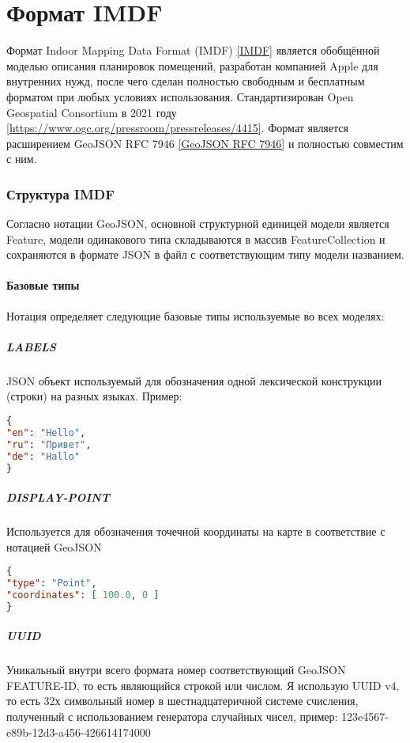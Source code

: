   \section{Формат IMDF}
    Формат Indoor Mapping Data Format (IMDF) \ref{IMDF} является обобщённой моделью описания планировок помещений, разработан компанией Apple для внутренних нужд, после чего сделан полностью свободным и бесплатным форматом при любых условиях использования. Стандартизирован Open Geospatial Consortium в 2021 году \ref{https://www.ogc.org/pressroom/pressreleases/4415}. Формат является расширением GeoJSON RFC 7946 \ref{GeoJSON RFC 7946} и полностью совместим с ним.

    \subsubsection{Структура IMDF}
      Согласно нотации GeoJSON, основной структурной единицей модели является Feature, модели одинакового типа складываются в массив FeatureCollection и сохраняются в формате JSON в файл с соответствующим типу модели названием.

      \paragraph{Базовые типы}
        Нотация определяет следующие базовые типы используемые во всех моделях:
        \subparagraph{LABELS}
          JSON объект используемый для обозначения одной лексической конструкции (строки) на разных языках. Пример:
          \begin{lstlisting}[language=json,caption={Пример модели LABELS}]
{
"en": "Hello",
"ru": "Привет",
"de": "Hallo"
}
          \end{lstlisting}

        \subparagraph{DISPLAY-POINT}
          Используется для обозначения точечной координаты на карте в соответствие с нотацией GeoJSON
          \begin{lstlisting}[language=json,caption={Пример модели DISPLAY-POINT}]
{
"type": "Point",
"coordinates": [ 100.0, 0 ]
}
          \end{lstlisting}

        \subparagraph{UUID}
          Уникальный внутри всего формата номер соответствующий GeoJSON FEATURE-ID, то есть являющийся строкой или числом.
          Я использую UUID v4, то есть 32х символьный номер в шестнадцатеричной системе счисления, полученный с использованием генератора случайных чисел, пример: 123e4567-e89b-12d3-a456-426614174000

